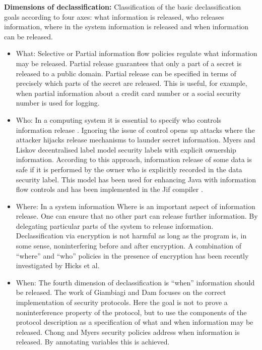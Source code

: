 \textbf{Dimensions of declassification:}
Classification of the basic declassification goals according to four axes: what information is released, who releases information, where in the system information is released and when information can be released.
\begin{itemize}
   \item What: Selective or Partial information flow policies \cite{ref_5_cohen1977information,ref_6_cohen1978information,ref_8_giacobazzi2005adjoining,ref_7_joshi2000semantic} regulate what
   information may be released. Partial release guarantees that only a part of a secret is
   released to a public domain. Partial release can be specified in terms of precisely which
   parts of the secret are released. This is useful,
   for example, when partial information about a credit card number or a social security number is used for logging.
   
   \item Who: In a computing system it is essential to specify who controls information release .
   Ignoring the issue of control opens up attacks where the attacker hijacks release
   mechanisms to launder secret information. Myers and Liskov decentralised label
   model \cite{ref_9_myers1997decentralized} security labels with explicit ownership information. According to this approach, information release of some data is safe if it is performed by the
   owner who is explicitly recorded in the data security label. This model has been used for enhancing Java with information flow controls \cite{ref_10_myers1999jflow} and has been implemented in
   the Jif compiler \cite{ref_11_myers2001jif}.
   
   \item Where: In a system information  Where is an important aspect of information release. One can ensure that no other  part can release further information. By delegating particular parts of the system to release information. Declassification
   via encryption is not harmful as long as the program is, in some sense, noninterfering
   before and after encryption.  A combination of \enquote{where} and \enquote{who} policies in the presence of encryption has
   been recently investigated by Hicks et al. \cite{ref_12_hicks2005declassification}
   
   \item When: The fourth dimension of declassification is  \enquote{when} information should be released. The work of Giambiagi and Dam \cite{ref_19_giambiagi2003secure} focuses on the correct implementation of security protocols. Here the goal is not to prove a noninterference property of the protocol, but to use the components of the protocol description as a specification of what and when information may be released. Chong and Myers security policies \cite{ref_13_chong2004security} address when information is released. By annotating variables this is achieved.
   
\end{itemize}

